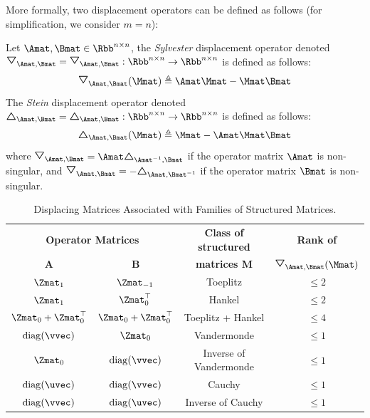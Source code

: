More formally, two displacement operators can be defined as follows (for simplification, we consider $m = n$):
\begin{definition}
  Let $\Amat, \Bmat \in \Rbb^{n \times n}$, the \emph{Sylvester} displacement operator denoted $\triangleopdown_{\Amat, \Bmat} = \triangleopdown_{\Amat, \Bmat}: \Rbb^{n \times n} \rightarrow \Rbb^{n \times n}$ is defined as follows:
  \begin{equation}
    \triangleopdown_{\Amat, \Bmat} (\Mmat) \triangleq \Amat \Mmat - \Mmat \Bmat
  \end{equation}
  The \emph{Stein} displacement operator denoted $\triangleopup_{\Amat, \Bmat} = \triangleopup_{\Amat, \Bmat}: \Rbb^{n \times n} \rightarrow \Rbb^{n \times n}$ is defined as follows:
  \begin{equation}
    \triangleopup_{\Amat, \Bmat} (\Mmat) \triangleq \Mmat - \Amat \Mmat \Bmat
  \end{equation}
  where $\triangleopdown_{\Amat, \Bmat} = \Amat \triangleopup_{\Amat^{-1}, \Bmat}$ if the operator matrix $\Amat$ is non-singular, and $\triangleopdown_{\Amat, \Bmat} = -\triangleopup_{\Amat, \Bmat^{-1}}$ if the operator matrix $\Bmat$ is non-singular.
\end{definition}



\begin{table}[t]
  \centering
  \begin{tabular}{c|c|c|c}
    \toprule
    \multicolumn{2}{c|}{\textbf{Operator Matrices}} & \textbf{Class of structured} & \textbf{Rank of } \\
    \textbf{A} & \textbf{B} & \textbf{matrices M} & $\triangleopdown_{\Amat, \Bmat}(\Mmat)$ \\
    \midrule
    $\Zmat_1$                & $\Zmat_{-1}$             & Toeplitz               & $\leq 2$ \\
    $\Zmat_1$                & $\Zmat_0^\top$           & Hankel                 & $\leq 2$ \\
    $\Zmat_0 + \Zmat_0^\top$ & $\Zmat_0 + \Zmat_0^\top$ & Toeplitz + Hankel      & $\leq 4$ \\
    $\diag(\vvec)$           & $\Zmat_0$                & Vandermonde            & $\leq 1$ \\
    $\Zmat_0$                & $\diag(\vvec)$           & Inverse of Vandermonde & $\leq 1$ \\
    $\diag(\uvec)$           & $\diag(\vvec)$           & Cauchy                 & $\leq 1$ \\
    $\diag(\vvec)$           & $\diag(\uvec)$           & Inverse of Cauchy      & $\leq 1$ \\
    \bottomrule
  \end{tabular}
  \caption{Displacing Matrices Associated with Families of Structured Matrices.}
  \label{table:ch2-displacing_matrices}
\end{table}



